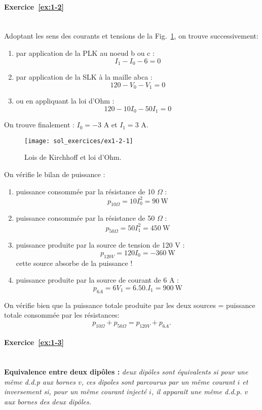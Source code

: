 \paragraph{Exercice~\ref{ex:1-2}}~\\%
Adoptant les sens des courants et tensions de la
Fig.~\ref{ex1-1sol}, on trouve successivement:
\begin{enumerate}
	\item par application de la PLK  au noeud b ou c :
	\[ I_1-I_0-6=0\]
	\item par  application de la SLK à la maille abca :
	\[120 - V_0 - V_1 = 0\]
	\item ou en appliquant la loi d'Ohm : 
	\[120 - 10I_0 - 50I_1 =0 \]
\end{enumerate}
On trouve finalement : $I_0=-3$ A et $I_1 = 3$ A.
\begin{figure}[h]
	\centering
	\texttt{[image: sol\_exercices/ex1-2-1]}
	\caption{Lois de Kirchhoff et loi d'Ohm.}\label{ex1-1sol}
\end{figure}
On vérifie le bilan de puissance : 
\begin{enumerate}
	\item puissance consommée par la résistance de 10 $\Omega$ : $$p_{10
		\Omega}= 10 I_0^2= 90~\text{W}$$
	\item puissance consommée par la résistance de 50 $\Omega$ : $$p_{50
		\Omega}= 50 I_1^2= 450~\text{W}$$
	\item puissance produite par la source de tension de 120 V : $$p_{120
		V}= 120 I_0= - 360~\text{W}$$
	cette source absorbe de la puissance !
	\item puissance produite par la source de courant de 6 A : $$p_{6A}
	= 6 V_1= 6.50.I_1 = 900~\text{W}$$
\end{enumerate}
On vérifie bien que la puissance totale produite par les
deux sources = puissance totale consommée par les résistances: $$p_{10\Omega}+p_{50\Omega}=p_{120V}+p_{6A}.$$

\paragraph{Exercice~\ref{ex:1-3}}~\\%
{\bf Equivalence entre deux dipôles :}
{\em deux dipôles sont équivalents si pour  une même
	d.d.p aux bornes $v$, ces dipoles sont parcourus par un même courant
	$i$ et inversement si, pour un même courant injecté $i$, il apparaît une
	même d.d.p. $v$ aux bornes des deux dipôles.}

